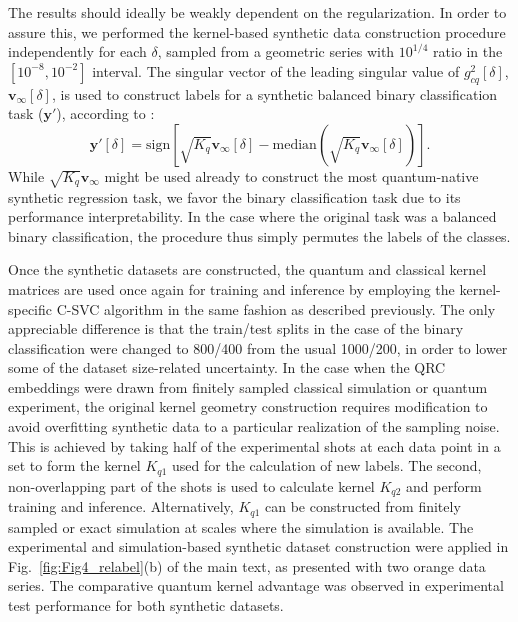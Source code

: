 \documentclass[english,floatfix,twocolumn,showpacs, aps, prx, reprint, superscriptaddress, longbibliography]{revtex4-2}
\begin{document}
The results should ideally be weakly dependent on the regularization. In order to assure this, we performed the kernel-based synthetic data construction procedure independently for each $\delta$, sampled from a geometric series with $10^{1/4}$ ratio in the $[10^{-8}, 10^{-2}]$ interval. The singular vector of the leading singular value of $g_{cq}^2[\delta]$, $\mathbf{v}_{\infty}[\delta]$, is used to construct labels for a synthetic balanced binary classification task ($\mathbf{y}'$), according to \cite{Hu2023}:
\begin{equation}\label{eq:newlabels}    \mathbf{y}'[\delta]=\mathrm{sign}\left[\sqrt{K_q}\mathbf{v}_{\infty}[\delta]-\mathrm{median}\left(\sqrt{K_q}\mathbf{v}_{\infty}[\delta]\right)\right].
\end{equation}
While $\sqrt{K_q}\mathbf{v}_{\infty}$ might be used already to construct the most quantum-native synthetic regression task, we favor the binary classification task due to its performance interpretability. In the case where the original task was a balanced binary classification, the procedure thus simply permutes the labels of the classes. 

Once the synthetic datasets are constructed, the quantum and classical kernel matrices are used once again for training and inference by employing the kernel-specific C-SVC algorithm \cite{Libsvm2011} in the same fashion as described previously. The only appreciable difference is that the train/test splits in the case of the binary classification were changed to 800/400 from the usual 1000/200, in order to lower some of the dataset size-related uncertainty. In the case when the QRC embeddings were drawn from finitely sampled classical simulation or quantum experiment, the original kernel geometry construction requires modification to avoid overfitting synthetic data to a particular realization of the sampling noise. This is achieved by taking half of the experimental shots at each data point in a set to form the kernel $K_{q1}$ used for the calculation of new labels. The second, non-overlapping part of the shots is used to calculate kernel $K_{q2}$ and perform training and inference. Alternatively, $K_{q1}$ can be constructed from finitely sampled or exact simulation at scales where the simulation is available. The experimental and simulation-based synthetic dataset construction were applied in Fig.~\ref{fig:Fig4_relabel}(b) of the main text, as presented with two orange data series. The comparative quantum kernel advantage was observed in experimental test performance for both synthetic datasets.
\end{document}
